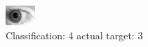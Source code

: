 \begin{figure}[h!]
\begin{center}
\includegraphics[width=0.60\columnwidth]{figures/ID308_class_4_target_3.png}
\end{center}
\caption{ Classification: 4 actual target: 3}
\label{fig:ID308_class_4_target_3}
\end{figure}
